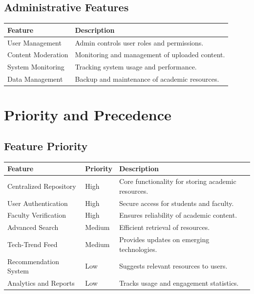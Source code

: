 \documentclass[12pt,a4paper]{report}
\begin{document}
\section{Administrative Features}

\begin{center}
\begin{tabular}{|l|p{8cm}|}
\hline
Feature & Description \\
\hline
User Management & Admin controls user roles and permissions. \\
\hline
Content Moderation & Monitoring and management of uploaded content. \\
\hline
System Monitoring & Tracking system usage and performance. \\
\hline
Data Management & Backup and maintenance of academic resources. \\
\hline
\end{tabular}
\end{center}

\chapter{Priority and Precedence}

\section{Feature Priority}

\begin{center}
\begin{tabular}{|l|l|p{6cm}|}
\hline
Feature & Priority & Description \\
\hline
Centralized Repository & High & Core functionality for storing academic resources. \\
\hline
User Authentication & High & Secure access for students and faculty. \\
\hline
Faculty Verification & High & Ensures reliability of academic content. \\
\hline
Advanced Search & Medium & Efficient retrieval of resources. \\
\hline
Tech-Trend Feed & Medium & Provides updates on emerging technologies. \\
\hline
Recommendation System & Low & Suggests relevant resources to users. \\
\hline
Analytics and Reports & Low & Tracks usage and engagement statistics. \\
\hline
\end{tabular}
\end{center}
\end{document}

